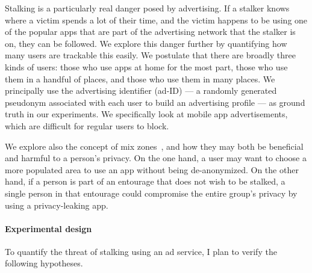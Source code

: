 Stalking is a particularly real danger posed by advertising. If a stalker knows where a victim spends a lot of their time, and the victim happens to be using one of the popular apps that are part of the advertising network that the stalker is on, they can be followed. We explore this danger further by quantifying how many users are trackable this easily. We postulate that there are broadly three kinds of users: those who use apps at home for the most part, those who use them in a handful of places, and those who use them in many places. We principally use the advertising identifier (ad-ID) --- a randomly generated pseudonym associated with each user to build an advertising profile --- as ground truth in our experiments.
We specifically look at mobile app advertisements, which are difficult for regular users to block.

We explore also the concept of mix zones~\cite{Beresford:2004}, and how they may both be beneficial and harmful to a person's privacy. On the one hand, a user may want to choose a more populated area to use an app without being de-anonymized. On the other hand, if a person is part of an entourage that does not wish to be stalked, a single person in that entourage could compromise the entire group's privacy by using a privacy-leaking app.

\paragraph*{Experimental design}
To quantify the threat of stalking using an ad service, I plan to verify the following hypotheses.

